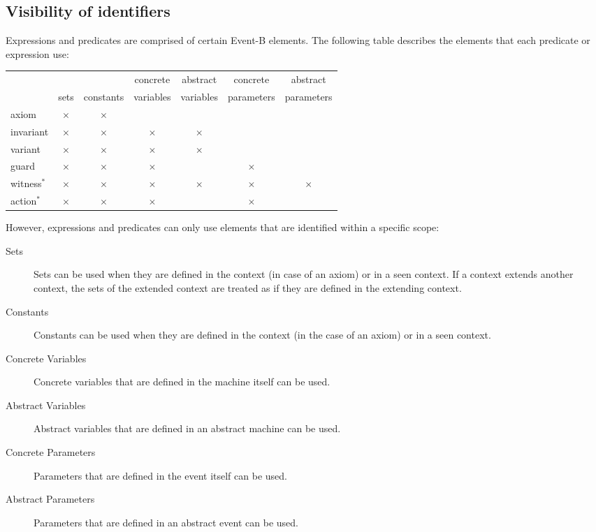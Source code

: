 \subsection{Visibility of identifiers}
\label{visibility_of_identifiers}

Expressions and predicates are comprised of certain Event-B elements. The following table describes the elements that each predicate or expression use:

\begin{center}
  \newcommand{\markcell}{$\times$}
  \begin{tabular}{lcccccc}
  \hline
               &           &           & concrete  & abstract  & concrete   & abstract \\
               & sets      & constants & variables & variables & parameters & parameters \\
  \hline
  axiom        & \markcell & \markcell &           &           &            & \\
  invariant    & \markcell & \markcell & \markcell & \markcell &            & \\
  variant      & \markcell & \markcell & \markcell & \markcell &            & \\
  guard        & \markcell & \markcell & \markcell &           & \markcell  & \\
  witness$^{*}$ & \markcell & \markcell & \markcell & \markcell & \markcell  & \markcell \\
  action$^{*}$  & \markcell & \markcell & \markcell &           & \markcell  &  \\
  \hline
  \end{tabular}    
\end{center}

However, expressions and predicates can only use elements that are identified within a specific scope:

\begin{description}
\item[Sets] Sets can be used when they are defined in the context (in case of an axiom) or in a seen context.
  If a context extends another context, the sets of the extended context are treated as if they
  are defined in the extending context.
\item[Constants] Constants can be used when they are defined in the context (in the case of an axiom) or in a seen context.
\item[Concrete Variables] Concrete variables that are defined in the machine itself can be used.
\item[Abstract Variables] Abstract variables  that are defined in an abstract machine can be used.
\item[Concrete Parameters] Parameters that are defined in the event itself can be used. 
\item[Abstract Parameters] Parameters that are defined in an abstract event can be used.
\end{description}




